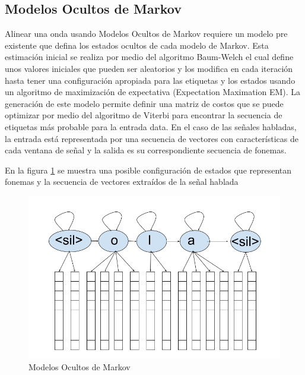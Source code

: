 \subsection{Modelos Ocultos de Markov}

Alinear una onda usando Modelos Ocultos de Markov requiere un modelo pre existente que defina los estados ocultos de cada modelo de Markov. Esta estimación inicial se realiza por medio del algoritmo Baum-Welch \cite{RabinerARecognition} el cual define unos valores iniciales que pueden ser aleatorios y los modifica en cada iteración hasta tener una configuración apropiada para las etiquetas y los estados usando un algoritmo de maximización de expectativa (Expectation Maximation EM). La generación de este modelo permite definir una matriz de costos que se puede optimizar por medio del algoritmo de Viterbi para encontrar la secuencia de etiquetas más probable para la entrada data. En el caso de las señales habladas, la entrada está representada por una secuencia de vectores con características de cada ventana de señal y la salida es su correspondiente secuencia de fonemas.



En la figura \ref{img:hmm} se muestra una posible configuración de estados que representan fonemas y la secuencia de vectores extraídos de la señal hablada

\begin{figure}[H]

\centering
\caption{Modelos Ocultos de Markov}
\label{img:hmm}
\includegraphics[scale=0.50]{imagenes/hmm.png}
\end{figure}

